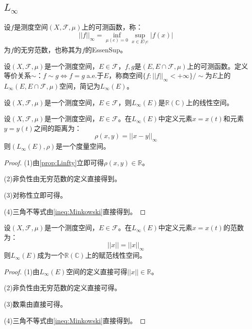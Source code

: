 \subsection{$L_{\infty}$}
\begin{definition}
	设$f$是测度空间$(X,\mathscr{F},\mu)$上的可测函数，称：
	\begin{equation*}
		||f||_\infty=\inf_{\mu(e)=0}\sup_{x\in E\setminus e}|f(x)|
	\end{equation*}
	为$f$的无穷范数，也称其为$f$的\gls{EssenSup}。
\end{definition}
\begin{definition}
	设$(X,\mathscr{F},\mu)$是一个测度空间，$E\in\mathscr{F}$，$f,g$是$(E,E\cap\mathscr{F},\mu)$上的可测函数。定义等价关系$\sim$：$f\sim g\Leftrightarrow f=g\;$a.e.于$E$，称商空间$\{f:||f||_\infty<+\infty\}/\sim$为$E$上的$L_{\infty}(E,E\cap\mathscr{F},\mu)$空间，简记为$L_{\infty}(E)$。
\end{definition}
\begin{property}\label{prop:Linfty}
	设$(X,\mathscr{F},\mu)$是一个测度空间，$E\in\mathscr{F}$，则$L_{\infty}(E)$是$\mathbb{R}(\mathbb{C})$上的线性空间。
\end{property}
\begin{definition}
	设$(X,\mathscr{F},\mu)$是一个测度空间，$E\in\mathscr{F}$。在$L_{\infty}(E)$中定义元素$x=x(t)$和元素$y=y(t)$之间的距离为：
	\begin{equation*}
		\rho(x,y)=||x-y||_\infty
	\end{equation*}
	则$(L_{\infty}(E),\rho)$是一个度量空间。
\end{definition}
\begin{proof}
	(1)由\cref{prop:Linfty}立即可得$\rho(x,y)\in\mathbb{R}$。\par
	(2)非负性由无穷范数的定义直接得到。\par
	(3)对称性立即可得。\par
	(4)三角不等式由\cref{ineq:Minkowski}直接得到。
\end{proof}
\begin{definition}
	设$(X,\mathscr{F},\mu)$是一个测度空间，$E\in\mathscr{F}$。在$L_{\infty}(E)$中定义元素$x=x(t)$的范数为：
	\begin{equation*}
		||x||=||x||_\infty
	\end{equation*}
	则$L_{\infty}(E)$成为一个$\mathbb{R}(\mathbb{C})$上的赋范线性空间。
\end{definition}
\begin{proof}
	(1)由$L_{\infty}(E)$空间的定义直接可得$||x||\in\mathbb{R}$。\par
	(2)非负性由无穷范数的定义直接可得。\par
	(3)数乘由直接可得。\par
	(4)三角不等式由\cref{ineq:Minkowski}直接得到。
\end{proof}

